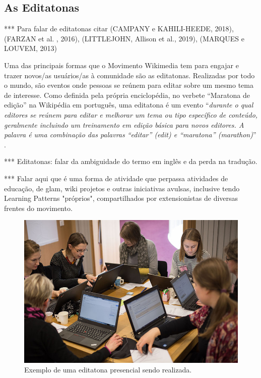 \subsection{As Editatonas}

*** Para falar de editatonas citar (CAMPANY e KAHILI-HEEDE, 2018), (FARZAN et al. , 2016), (LITTLEJOHN, Allison et al., 2019), (MARQUES e LOUVEM, 2013)

Uma das principais formas que o Movimento Wikimedia tem para engajar e trazer novos/as usuários/as à comunidade são as editatonas. Realizadas por todo o mundo, são eventos onde pessoas se reúnem para editar sobre um mesmo tema de interesse. Como definida pela própria enciclopédia, no verbete ``Maratona de edição'' na Wikipédia em português, uma editatona é um evento ``\textit{durante o qual editores se reúnem para editar e melhorar um tema ou tipo específico de conteúdo, geralmente incluindo um treinamento em edição básica para novos editores. A palavra é uma combinação das palavras ``editar'' (\textit{edit}) e ``maratona'' (\textit{marathon})}'' .

*** Editatonas: falar da ambiguidade do termo em inglês e da perda na tradução.

*** Falar aqui que é uma forma de atividade que perpassa atividades de educação, de glam, wiki projetos e outras iniciativas avulsas, inclusive tendo Learning Patterns "próprios", compartilhados por extensionistas de diversas frentes do movimento.

\begin{figure}[H]
    \centering
    \includegraphics[width=1\textwidth]{Images/editatona_antiga.jpg}
    \caption{Exemplo de uma editatona presencial sendo realizada.}
    \label{fig:editatona_antiga}
\end{figure}

